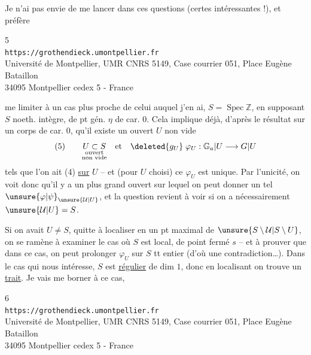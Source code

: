 Je n'ai pas envie de me lancer dans ces questions (certes intéressantes !),
et préfère

\begin{center}
\small
5\\
\texttt{https://grothendieck.umontpellier.fr}\\
Université de Montpellier, UMR CNRS 5149, Case courrier 051, Place Eugène Bataillon\\
34095 Montpellier cedex 5 - France
\end{center}


me limiter à un cas plus proche de celui auquel j'en ai, $S=\operatorname{Spec}\mathbb Z$,
en supposant $S$ noeth. intègre,  de pt gén. $\eta$
de car. $0$. Cela implique déjà, d'après le résultat sur un corps de car. $0$,
qu'il existe un ouvert $U$ non vide
\[
(5)\qquad
\underset{\substack{\text{ouvert}\\\text{non vide}}}{U\subset S}
\quad\text{et}\quad
\deleted{g_U}\;\varphi_U:\mathbb G_a\vert U\longrightarrow G\vert U
\]
tels que l'on ait (4) \uline{sur} $U$ -- et (pour $U$ choisi) ce $\varphi_U$
est unique. Par l'unicité, on voit donc qu'il y a un plus grand ouvert
 sur lequel on peut donner un tel
$\unsure{\varphi|\psi}_{\unsure{\mathcal U|U}}$,
et la question revient à voir si on a nécessairement $\unsure{\mathcal U|U}=S$.

Si on avait $U\ne S$, quitte à localiser en un pt maximal de $\unsure{S\setminus\mathcal U|S\setminus U}$,
on  se ramène à examiner le cas où $S$ est local,
de point fermé $s$ -- et à  prouver
que dans ce cas, on peut prolonger $\varphi_U$ sur $S$ tt entier
(d'où une contradiction\ldots). Dans le cas qui nous intéresse, $S$ est
\uline{régulier} de dim $1$, donc en localisant on trouve un \uline{trait}.
Je vais me borner à ce cas, 

\begin{center}
\small
6\\
\texttt{https://grothendieck.umontpellier.fr}\\
Université de Montpellier, UMR CNRS 5149, Case courrier 051, Place Eugène Bataillon\\
34095 Montpellier cedex 5 - France
\end{center}

